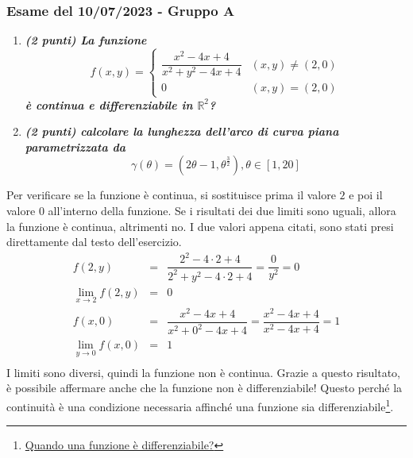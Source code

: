 \documentclass[a4paper]{article}
\begin{document}
	\subsubsection{Esame del 10/07/2023 - Gruppo A}

	\begin{enumerate}[label=\alph*)]
		\item \textcolor{Green4}{\textbf{\emph{(2 punti) La funzione}}}
		\begin{equation*}
			f\left(x,y\right) = \begin{cases}
				\dfrac{
					x^{2} - 4x + 4
				}{
					x^{2} + y^{2} - 4x + 4
				} & \left(x,y\right) \ne \left(2,0\right) \\
				0 & \left(x,y\right) = \left(2,0\right)
			\end{cases}
		\end{equation*}
		\textcolor{Green4}{\textbf{\emph{è continua e differenziabile in $\mathbb{R}^{2}$?}}}

		\item \textcolor{Green4}{\textbf{\emph{(2 punti) calcolare la lunghezza dell'arco di curva piana parametrizzata da}}}
		\begin{equation*}
			\gamma\left(\theta\right) = \left(2\theta - 1, \theta^{\frac{3}{2}}\right), \theta \in \left[1,20\right]
		\end{equation*}
	\end{enumerate}
	Per verificare se la funzione è continua, si sostituisce prima il valore $2$ e poi il valore $0$ all'interno della funzione. Se i risultati dei due limiti sono uguali, allora la funzione è continua, altrimenti no. I due valori appena citati, sono stati presi direttamente dal testo dell'esercizio.
	\begin{equation*}
		\begin{array}{rcl}
			f\left(2,y\right) &=& \dfrac{2^{2} - 4 \cdot 2 + 4}{2^{2} + y^{2} - 4 \cdot 2 + 4} = \dfrac{0}{y^{2}} = 0 \\ [1em]
			\displaystyle\lim_{x \rightarrow 2} f\left(2,y\right) &=& 0 \\ [1em]
			f\left(x,0\right) &=& \dfrac{x^{2} - 4x + 4}{x^{2} + 0^{2} - 4x + 4} = \dfrac{x^{2} - 4x + 4}{x^{2} - 4x + 4} = 1 \\ [1em]
			\displaystyle\lim_{y \rightarrow 0} f\left(x,0\right) &=& 1 \\ [1em]
		\end{array}
	\end{equation*}
	I limiti sono diversi, quindi la funzione non è continua. Grazie a questo risultato, è possibile affermare anche che la funzione non è differenziabile! Questo perché la continuità è una condizione necessaria affinché una funzione sia differenziabile\footnote{\href{https://www.youmath.it/lezioni/analisi-due/varie/816-differenziabilita-di-una-funzione-a-due-variabili.html}{Quando una funzione è differenziabile?}}.\newline
\end{document}
